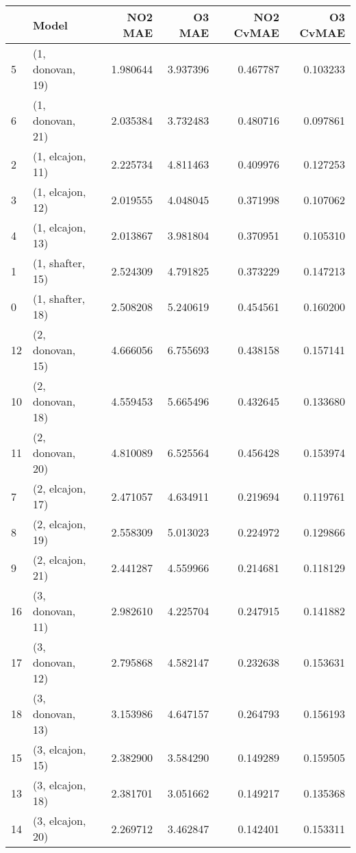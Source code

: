\begin{tabular}{llrrrr}
\toprule
{} &             Model &   NO2 MAE &    O3 MAE &  NO2 CvMAE &  O3 CvMAE \\
\midrule
5  &  (1, donovan, 19) &  1.980644 &  3.937396 &   0.467787 &  0.103233 \\
6  &  (1, donovan, 21) &  2.035384 &  3.732483 &   0.480716 &  0.097861 \\
2  &  (1, elcajon, 11) &  2.225734 &  4.811463 &   0.409976 &  0.127253 \\
3  &  (1, elcajon, 12) &  2.019555 &  4.048045 &   0.371998 &  0.107062 \\
4  &  (1, elcajon, 13) &  2.013867 &  3.981804 &   0.370951 &  0.105310 \\
1  &  (1, shafter, 15) &  2.524309 &  4.791825 &   0.373229 &  0.147213 \\
0  &  (1, shafter, 18) &  2.508208 &  5.240619 &   0.454561 &  0.160200 \\
12 &  (2, donovan, 15) &  4.666056 &  6.755693 &   0.438158 &  0.157141 \\
10 &  (2, donovan, 18) &  4.559453 &  5.665496 &   0.432645 &  0.133680 \\
11 &  (2, donovan, 20) &  4.810089 &  6.525564 &   0.456428 &  0.153974 \\
7  &  (2, elcajon, 17) &  2.471057 &  4.634911 &   0.219694 &  0.119761 \\
8  &  (2, elcajon, 19) &  2.558309 &  5.013023 &   0.224972 &  0.129866 \\
9  &  (2, elcajon, 21) &  2.441287 &  4.559966 &   0.214681 &  0.118129 \\
16 &  (3, donovan, 11) &  2.982610 &  4.225704 &   0.247915 &  0.141882 \\
17 &  (3, donovan, 12) &  2.795868 &  4.582147 &   0.232638 &  0.153631 \\
18 &  (3, donovan, 13) &  3.153986 &  4.647157 &   0.264793 &  0.156193 \\
15 &  (3, elcajon, 15) &  2.382900 &  3.584290 &   0.149289 &  0.159505 \\
13 &  (3, elcajon, 18) &  2.381701 &  3.051662 &   0.149217 &  0.135368 \\
14 &  (3, elcajon, 20) &  2.269712 &  3.462847 &   0.142401 &  0.153311 \\
\bottomrule
\end{tabular}
